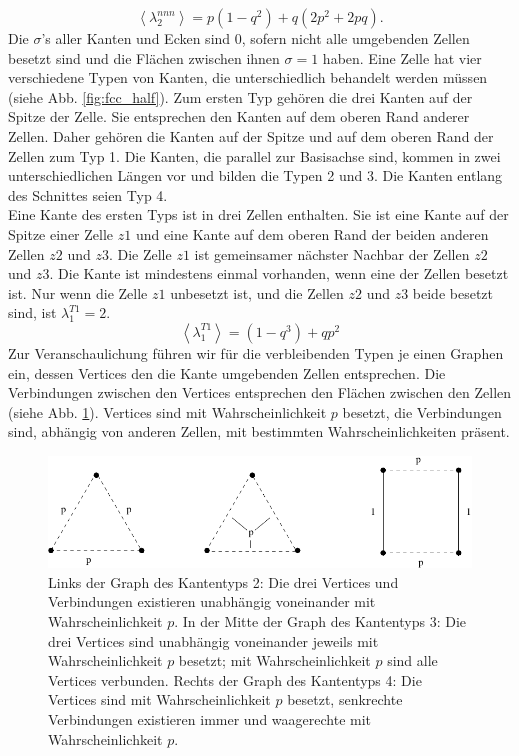 \begin{equation}
   \left< \lambda_2^{nnn}\right> =p(1-q^2)+q(2p^2+2pq).
\end{equation} 
Die $\sigma$'s aller Kanten und Ecken sind 0, sofern nicht alle umgebenden Zellen besetzt sind und die Fl\"achen zwischen ihnen $\sigma=1$ haben. Eine Zelle hat vier verschiedene Typen von Kanten, die unterschiedlich behandelt werden m\"ussen (siehe Abb. \ref{fig:fcc_half}). Zum ersten Typ geh\"oren die drei Kanten auf der Spitze der Zelle. Sie entsprechen den Kanten auf dem oberen Rand anderer Zellen. Daher geh\"oren die Kanten auf der Spitze und auf dem oberen Rand der Zellen zum Typ 1. Die Kanten, die parallel zur Basisachse sind, kommen in zwei unterschiedlichen L\"angen vor und bilden die Typen 2 und 3. Die Kanten entlang des Schnittes seien Typ 4.
\\Eine Kante des ersten Typs ist in drei Zellen enthalten. Sie ist eine Kante auf der Spitze einer Zelle $z1$ und eine Kante auf dem oberen Rand der beiden anderen Zellen $z2$ und $z3$. Die Zelle $z1$ ist gemeinsamer n\"achster Nachbar der Zellen $z2$ und $z3$. Die Kante ist mindestens einmal vorhanden, wenn eine der Zellen besetzt ist. Nur wenn die Zelle $z1$ unbesetzt ist, und die Zellen $z2$ und $z3$ beide besetzt sind, ist $\lambda_1^{T1}=2$.
\begin{equation}
\left<\lambda_1^{T1}\right>=(1-q^3)+qp^2
\end{equation}
Zur Veranschaulichung f\"uhren wir f\"ur die verbleibenden Typen je einen Graphen ein, dessen Vertices den die Kante umgebenden Zellen entsprechen. Die Verbindungen zwischen den Vertices entsprechen den Fl\"achen zwischen den Zellen (siehe Abb. \ref{fig:diagraph}). Vertices sind mit Wahrscheinlichkeit $p$ besetzt, die Verbindungen sind, abh\"angig von anderen Zellen, mit bestimmten Wahrscheinlichkeiten pr\"asent. 
\begin{figure}[htbp] 
  \centering
  \includegraphics{./Fluct_topo-Figs/diagraph}
  \caption{Links der Graph des Kantentyps 2: Die drei Vertices und Verbindungen existieren unabh\"angig voneinander mit Wahrscheinlichkeit $p$. In der Mitte der Graph des Kantentyps 3: Die drei Vertices sind unabh\"angig voneinander jeweils mit Wahrscheinlichkeit $p$ besetzt; mit Wahrscheinlichkeit $p$ sind alle Vertices verbunden. Rechts der Graph des Kantentyps 4: Die Vertices sind mit Wahrscheinlichkeit $p$ besetzt, senkrechte Verbindungen existieren immer und waagerechte mit Wahrscheinlichkeit $p$.}
  \label{fig:diagraph}
\end{figure}
